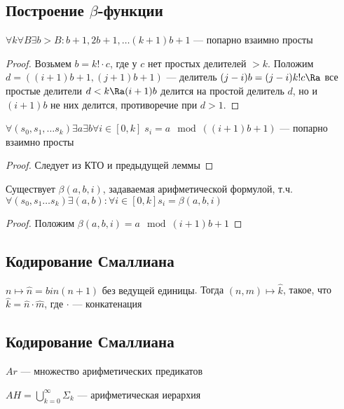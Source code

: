 \subsection{Построение \(\beta\)-функции}
\begin{lemma}
    \(\forall k \forall B \exists b > B: b + 1, 2b + 1, \dots (k + 1)b + 1\) --- попарно взаимно просты
\end{lemma}
\begin{proof}
    Возьмем \(b = k!\cdot c\), где у \(c\) нет простых делителей \(> k\). Положим \(d = ((i + 1)b + 1, (j + 1)b + 1)\) --- делитель \((j - i)b = (j - i)k!c \Ra\) все простые делители \(d < k \Ra (i + 1)b\) делится на простой делитель \(d\), но и \((i + 1)b\) не них делится, противоречие при \(d > 1\).
\end{proof}
\begin{lemma}
    \(\forall (s_0, s_1, \dots s_k) \exists a \exists b \forall i \in [0, k]\; s_i = a \mod((i + 1)b + 1)\) --- попарно взаимно просты
\end{lemma}
\begin{proof}
    Следует из КТО и предыдущей леммы
\end{proof}
\begin{theorem}
    Существует \(\beta(a, b, i)\), задаваемая арифметической формулой, т.ч. \(\forall (s_0, s_1 \dots s_k) \exists (a, b): \forall i \in [0, k] s_i = \beta(a, b, i)\)
\end{theorem}
\begin{proof}
    Положим \(\beta(a, b, i) = a \mod (i + 1)b + 1\)
\end{proof}

\subsection{Кодирование Смаллиана}
\(n \mapsto \widehat{n} = bin(n + 1)\text{ без ведущей единицы}\).
Тогда \((n, m) \mapsto \widehat{k}\), такое, что \(\widehat{k} = \widehat{n}\cdot\widehat{m}\), где \(\cdot\) --- конкатенация

\subsection{Кодирование Смаллиана}

\begin{definition}
    \(Ar\) --- множество арифметических предикатов
\end{definition}
\begin{definition}
    \(AH = \bigcup_{k = 0}^\infty \Sigma_k\) --- арифметическая иерархия
\end{definition}

